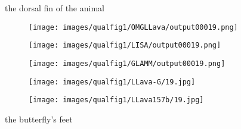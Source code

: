 \begin{figure*}[t]
\centering
the dorsal fin of the animal

\begin{subfigure}{0.19\textwidth}
\texttt{[image: images/qualfig1/OMGLLava/output00019.png]}
\end{subfigure}%
\begin{subfigure}{0.19\textwidth}
\texttt{[image: images/qualfig1/LISA/output00019.png]}
\end{subfigure}%
\begin{subfigure}{0.19\textwidth}
\texttt{[image: images/qualfig1/GLAMM/output00019.png]}
\end{subfigure}%
\begin{subfigure}{0.19\textwidth}
\texttt{[image: images/qualfig1/LLava-G/19.jpg]}
\end{subfigure}%
\begin{subfigure}{0.19\textwidth}
\texttt{[image: images/qualfig1/LLava157b/19.jpg]}
\end{subfigure}

the butterfly's feet 


\end{figure*}
